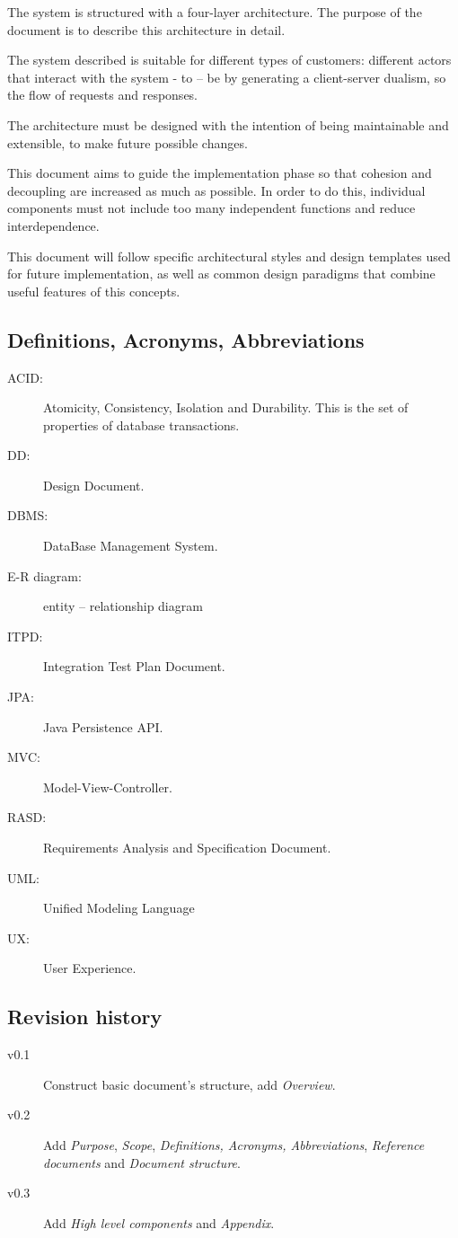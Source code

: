 \documentclass{article}
\begin{document}
	The system is structured with a four-layer architecture. The purpose of the document is to describe this architecture in detail.

	\bigskip
	The system described is suitable for different types of customers: different actors that interact with the system - to – be by generating a client-server dualism, so the flow of requests and responses.
	
	The architecture must be designed with the intention of being maintainable and extensible, to make future possible changes.
	
	\bigskip
	This document aims to guide the implementation phase so that cohesion and decoupling are increased as much as possible. In order to do this, individual components must not include too many independent functions and reduce interdependence.
	
	This document will follow specific architectural styles and design templates used for future implementation, as well as common design paradigms that combine useful features of this concepts.


	
	\subsection{Definitions, Acronyms, Abbreviations}
	\begin{description}
	\item[ACID:] Atomicity, Consistency, Isolation and Durability. This is the set of properties of database transactions.
	\item[DD:] Design Document.
	\item[DBMS:] DataBase Management System.
	\item[E-R diagram:] entity – relationship diagram
	\item[ITPD:] Integration Test Plan Document.
	\item[JPA:] Java Persistence API.
	\item[MVC:] Model-View-Controller.
	\item[RASD:] Requirements Analysis and Specification Document.
	\item[UML:] Unified Modeling Language
	\item[UX:] User Experience.
	\end{description}
	
	
	\subsection{Revision history}
	\begin{description}
		\item[v0.1] Construct basic document's structure, add \textit{Overview}.
		\item[v0.2] Add \textit{Purpose}, \textit{Scope}, \textit{Definitions, Acronyms, Abbreviations}, \textit{Reference documents} and \textit{Document structure}.
		\item[v0.3] Add \textit{High level components} and \textit{Appendix}.
	\end{description}
	
\end{document}
